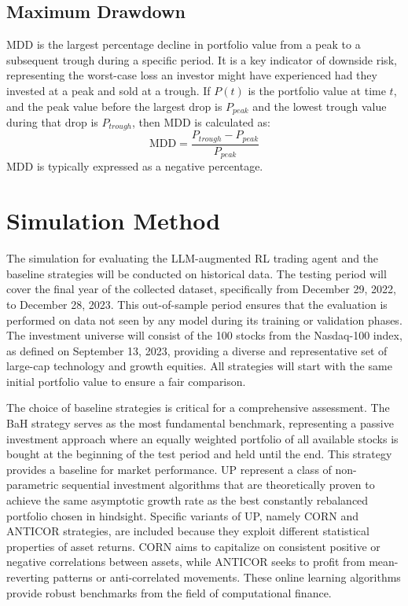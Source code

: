 \subsection{Maximum Drawdown}
\gls{MDD} is the largest percentage decline in portfolio value from a peak to a subsequent trough during a specific period. It is a key indicator of downside risk, representing the worst-case loss an investor might have experienced had they invested at a peak and sold at a trough. If \(P(t)\) is the portfolio value at time \(t\), and the peak value before the largest drop is \(P_{peak}\) and the lowest trough value during that drop is \(P_{trough}\), then \gls{MDD} is calculated as:
\[\text{MDD} = \frac{P_{trough} - P_{peak}}{P_{peak}}\]
\gls{MDD} is typically expressed as a negative percentage.

\section{Simulation Method}
The simulation for evaluating the \gls{LLM}-augmented \gls{RL} trading agent and the baseline strategies will be conducted on historical data. The testing period will cover the final year of the collected dataset, specifically from December 29, 2022, to December 28, 2023. This out-of-sample period ensures that the evaluation is performed on data not seen by any model during its training or validation phases. The investment universe will consist of the 100 stocks from the Nasdaq-100 index, as defined on September 13, 2023, providing a diverse and representative set of large-cap technology and growth equities. All strategies will start with the same initial portfolio value to ensure a fair comparison.

The choice of baseline strategies is critical for a comprehensive assessment. The \gls{BaH} strategy serves as the most fundamental benchmark, representing a passive investment approach where an equally weighted portfolio of all available stocks is bought at the beginning of the test period and held until the end. This strategy provides a baseline for market performance. \gls{UP} represent a class of non-parametric sequential investment algorithms that are theoretically proven to achieve the same asymptotic growth rate as the best constantly rebalanced portfolio chosen in hindsight. Specific variants of \gls{UP}, namely \gls{CORN} and \gls{ANTICOR} strategies, are included because they exploit different statistical properties of asset returns. \gls{CORN} aims to capitalize on consistent positive or negative correlations between assets, while \gls{ANTICOR} seeks to profit from mean-reverting patterns or anti-correlated movements. These online learning algorithms provide robust benchmarks from the field of computational finance.


